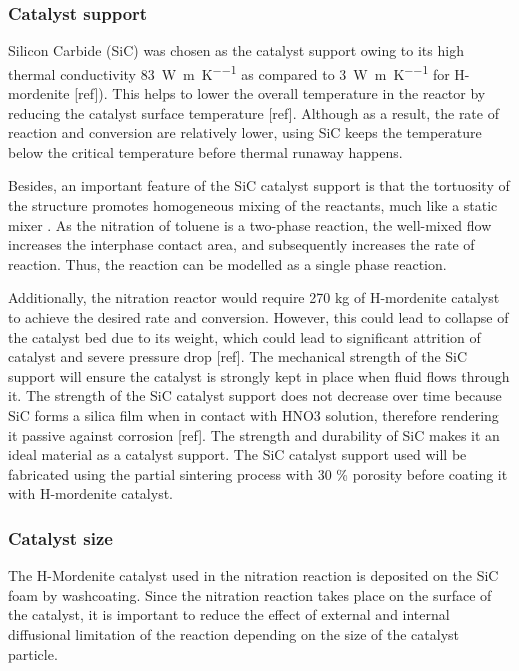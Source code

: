 \subsubsection{Catalyst support}
Silicon Carbide (SiC) was chosen as the catalyst support owing to its high thermal conductivity \SI{83}{\W\per\m\per\K} as compared to \SI{3}{\W\per\m\per\K} for H-mordenite [ref]). This helps to lower the overall temperature in the reactor by reducing the catalyst surface temperature [ref]. Although as a result, the rate of reaction and conversion are relatively lower, using SiC keeps the temperature below the critical temperature before thermal runaway happens. 

Besides, an important feature of the SiC catalyst support is that the tortuosity of the structure promotes homogeneous mixing of the reactants, much like a static mixer \cite{duong-viet_silicon_2016}. As the nitration of toluene is a two-phase reaction, the well-mixed flow increases the interphase contact area, and subsequently increases the rate of reaction. Thus, the reaction can be modelled as a single phase reaction.

Additionally, the nitration reactor would require 270 kg of H-mordenite catalyst to achieve the desired rate and conversion. However, this could lead to collapse of the catalyst bed due to its weight, which could lead to significant attrition of catalyst and severe pressure drop [ref]. The mechanical strength of the SiC support will ensure the catalyst is strongly kept in place when fluid flows through it. The strength of the SiC catalyst support does not decrease over time because SiC forms a silica film when in contact with HNO3 solution, therefore rendering it passive against corrosion [ref]. The strength and durability of SiC makes it an ideal material as a catalyst support. The SiC catalyst support used will be fabricated using the partial sintering process with 30 \% porosity before coating it with H-mordenite catalyst.

\subsubsection{Catalyst size}
The H-Mordenite catalyst used in the nitration reaction is deposited on the SiC foam by washcoating. Since the nitration reaction takes place on the surface of the catalyst, it is important to reduce the effect of external and internal diffusional limitation of the reaction depending on the size of the catalyst particle.  

